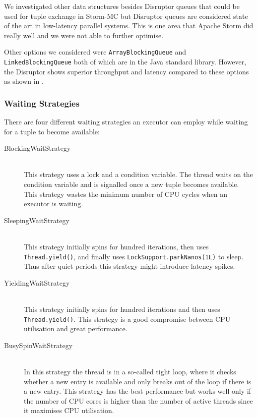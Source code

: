 \documentclass[bsc,logo,frontabs,twoside,singlespacing,normalheadings,parskip]{infthesis}\usepackage[]{graphicx}\usepackage[]{color}
\begin{document}
We investigated other data structures besides Disruptor queues that could be used for tuple exchange in Storm-MC but Disruptor queues are considered state of the art in low-latency parallel systems. This is one area that Apache Storm did really well and we were not able to further optimise.

Other options we considered were \texttt{ArrayBlockingQueue} and \texttt{LinkedBlockingQueue} both of which are in the Java standard library. However, the Disruptor shows superior throughput and latency compared to these options as shown in \citep{DisruptorWiki}.

\subsubsection{Waiting Strategies}

There are four different waiting strategies an executor can employ while waiting for a tuple to become available:

\begin{description}
	\item[BlockingWaitStrategy] \hfill \\
	This strategy uses a lock and a condition variable. The thread waits on the condition variable and is signalled once a new tuple becomes available. This strategy wastes the minimum number of CPU cycles when an executor is waiting.
	\item[SleepingWaitStrategy] \hfill \\
	This strategy initially spins for hundred iterations, then uses \texttt{Thread.yield()}, and finally uses \texttt{LockSupport.parkNanos(1L)} to sleep. Thus after quiet periods this strategy might introduce latency spikes.
	\item[YieldingWaitStrategy] \hfill \\
	This strategy initially spins for hundred iterations and then uses \texttt{Thread.yield()}. This strategy is a good compromise between CPU utilisation and great performance.
	\item[BusySpinWaitStrategy] \hfill \\
	In this strategy the thread is in a so-called tight loop, where it checks whether a new entry is available and only breaks out of the loop if there is a new entry. This strategy has the best performance but works well only if the number of CPU cores is higher than the number of active threads since it maximises CPU utilisation.
\end{description}
\end{document}
